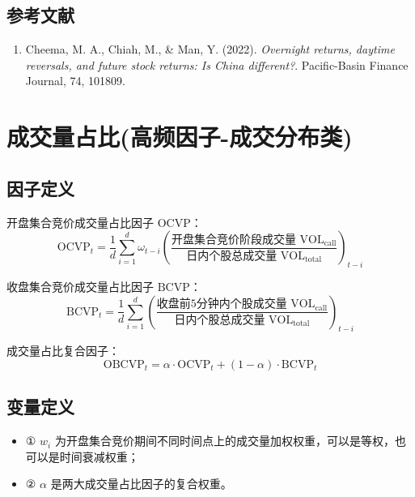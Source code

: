 \documentclass{article}
\begin{document}
\subsection{参考文献}
\begin{enumerate}
    \item Cheema, M. A., Chiah, M., \& Man, Y. (2022). \textit{Overnight returns, daytime reversals, and future stock returns: Is China different?}. Pacific-Basin Finance Journal, 74, 101809.
\end{enumerate}

\section{成交量占比(高频因子-成交分布类)}

\subsection{因子定义}
开盘集合竞价成交量占比因子 \( \mathrm{OCVP} \)：
\begin{equation}
    \mathrm{OCVP}_t = \frac{1}{d} \sum_{i=1}^{d} \omega_{t-i}\left( \frac{\text{开盘集合竞价阶段成交量 } \mathrm{VOL}_{\mathrm{call}}}{\text{日内个股总成交量 } \mathrm{VOL}_{\mathrm{total}}} \right)_{t-i}
\end{equation}

收盘集合竞价成交量占比因子 \( \mathrm{BCVP} \)：
\begin{equation}
    \mathrm{BCVP}_t = \frac{1}{d} \sum_{i=1}^{d} \left( \frac{\text{收盘前5分钟内个股成交量 } \mathrm{VOL}_{\mathrm{call}}}{\text{日内个股总成交量 } \mathrm{VOL}_{\mathrm{total}}} \right)_{t-i}
\end{equation}

成交量占比复合因子：
\begin{equation}
    \mathrm{OBCVP}_t = \alpha \cdot \mathrm{OCVP}_t + (1 - \alpha) \cdot \mathrm{BCVP}_t
\end{equation}

\subsection{变量定义}
\begin{itemize}
    \item ① \( w_i \) 为开盘集合竞价期间不同时间点上的成交量加权权重，可以是等权，也可以是时间衰减权重；
    \item ② \( \alpha \) 是两大成交量占比因子的复合权重。
\end{itemize}
\end{document}
